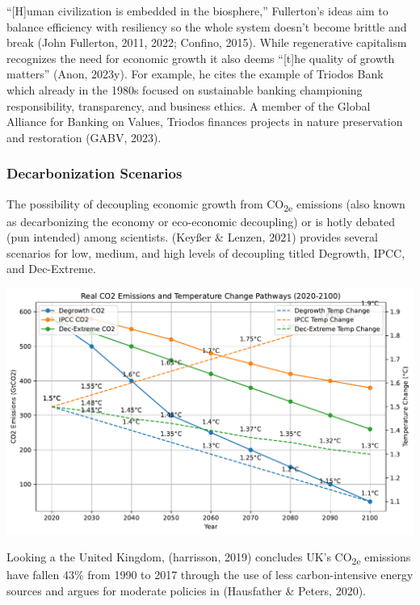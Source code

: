 \documentclass[
  letterpaper,
  DIV=11,
  numbers=noendperiod]{scrartcl}
\begin{document}
``{[}H{]}uman civilization is embedded in the biosphere,'' Fullerton's
ideas aim to balance efficiency with resiliency so the whole system
doesn't become brittle and break (John Fullerton, 2011, 2022; Confino,
2015). While regenerative capitalism recognizes the need for economic
growth it also deems ``{[}t{]}he quality of growth matters'' (Anon,
2023y). For example, he cites the example of Triodos Bank which already
in the 1980s focused on sustainable banking championing responsibility,
transparency, and business ethics. A member of the Global Alliance for
Banking on Values, Triodos finances projects in nature preservation and
restoration (GABV, 2023).

\subsubsection{Decarbonization
Scenarios}\label{decarbonization-scenarios}

The possibility of decoupling economic growth from CO\textsubscript{2e}
emissions (also known as decarbonizing the economy or eco-economic
decoupling) or is hotly debated (pun intended) among scientists. (Keyßer
\& Lenzen, 2021) provides several scenarios for low, medium, and high
levels of decoupling titled Degrowth, IPCC, and Dec-Extreme.

\includegraphics{_thesis_files/figure-pdf/cell-47-output-1.pdf}

Looking a the United Kingdom, (harrisson, 2019) concludes UK's
CO\textsubscript{2e} emissions have fallen 43\% from 1990 to 2017
through the use of less carbon-intensive energy sources and argues for
moderate policies in (Hausfather \& Peters, 2020).
\end{document}
